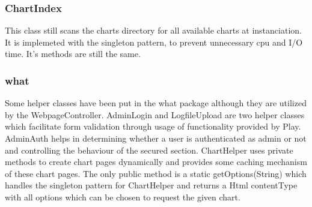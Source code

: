 \subsubsection{ChartIndex}
This class still scans the charts directory for all available charts at instanciation.
It is implemeted with the singleton pattern, to prevent unnecessary cpu and I/O time.
It's methods are still the same.

\subsubsection{what}
Some helper classes have been put in the what package although they are utilized by the WebpageController.
AdminLogin and LogfileUpload are two helper classes which facilitate form validation through usage of
functionality provided by Play.
AdminAuth helps in determining whether a user is authenticated as admin or not and controlling the behaviour
of the secured section.
ChartHelper uses private methods to create chart pages dynamically and provides some caching mechanism
of these chart pages. The only public method is a static getOptions(String) which handles the singleton pattern
for ChartHelper and returns a Html contentType with all options which can be chosen to request the given chart.


 
